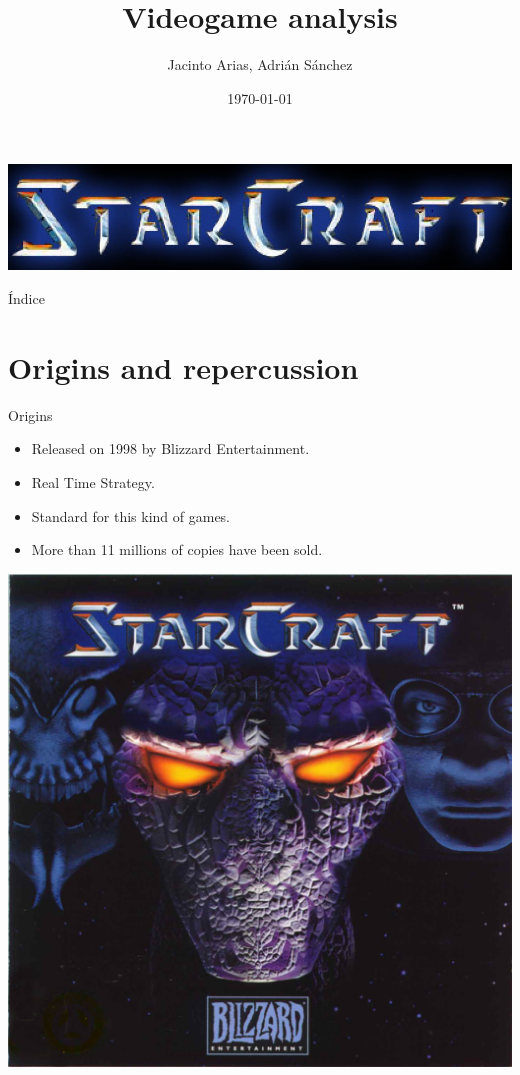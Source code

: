 \documentclass[10pt]{beamer}
\title{Videogame analysis}
\author{Jacinto Arias, Adrián Sánchez}
\institute{AI in Videogames \and University of Castilla-La Mancha}
\date{\today}
\begin{document}


\begin{frame}
		\begin{center}
		\includegraphics[scale=0.3]{logo.jpg} 
		\end{center}
		\titlepage
\end{frame}




	\begin{frame}{Índice}
		\tableofcontents
	\end{frame}

\section{Origins and repercussion}


\begin{frame}{Origins}
	  \begin{itemize}
	   \item Released on 1998 by Blizzard Entertainment.
	   \item Real Time Strategy.
	   \item Standard for this kind of games.
	   \item More than 11 millions of copies have been sold.

	  \end{itemize}

\begin{center}
	  \includegraphics[scale=0.4]{logo1.jpg}\end{center}

\end{frame}
\end{document}
